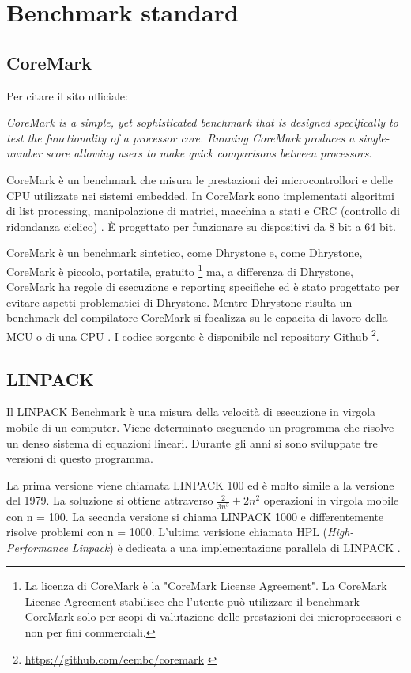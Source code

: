 \documentclass[12pt, a4paper]{report}
\begin{document}
\section{Benchmark standard}

\newpage
\subsection{CoreMark}
Per citare il sito ufficiale: 

\textit{CoreMark is a simple, yet sophisticated benchmark that is designed specifically to test the functionality of a processor core. Running CoreMark produces a single-number score allowing users to make quick comparisons between processors}. 

CoreMark è un benchmark che misura le prestazioni dei microcontrollori e delle CPU utilizzate nei sistemi embedded. In CoreMark sono implementati algoritmi di list processing, manipolazione di matrici, macchina a stati e CRC (controllo di ridondanza ciclico) . È progettato per funzionare su dispositivi da 8 bit a 64 bit\cite{CoreMark}.

CoreMark è un benchmark sintetico, come Dhrystone e, come Dhrystone, CoreMark è piccolo, portatile, gratuito \footnote{La licenza di CoreMark è la "CoreMark License Agreement". La CoreMark License Agreement stabilisce che l'utente può utilizzare il benchmark CoreMark solo per scopi di valutazione delle prestazioni dei microprocessori e non per fini commerciali.} ma, a differenza di Dhrystone, CoreMark ha regole di esecuzione e reporting specifiche ed è stato progettato per evitare aspetti problematici di Dhrystone. Mentre Dhrystone risulta un benchmark del compilatore CoreMark si focalizza su le capacita di lavoro della MCU o di una CPU \cite{analysis_EEMBC}.
I codice sorgente è disponibile nel repository Github \footnote{\url{https://github.com/eembc/coremark} \cite{RepoCoreMark}}.
		

\subsection{LINPACK}
Il LINPACK Benchmark è una misura della velocità di esecuzione in virgola mobile di un computer. Viene determinato eseguendo un programma che risolve un denso sistema di equazioni lineari. Durante gli anni si sono sviluppate tre versioni di questo programma. 

La prima versione viene chiamata LINPACK 100 ed è molto simile a la versione del 1979. La soluzione si ottiene attraverso $ \frac{2}{3n^3} + 2n^2 $ operazioni in virgola mobile con n = 100. La seconda versione si chiama LINPACK 1000 e differentemente risolve problemi con n = 1000. L'ultima verisione chiamata HPL (\textit{High-Performance Linpack}) è dedicata a una implementazione parallela di LINPACK\cite{LINPACK_PastPresFut} \cite{hplNetLib}.
\end{document}
